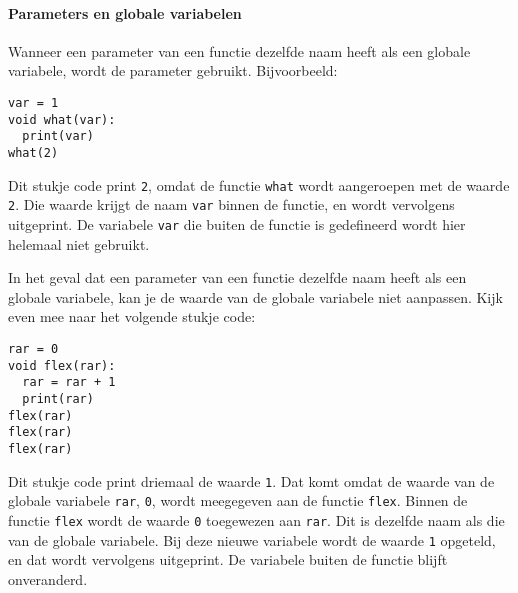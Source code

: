 
\paragraph{Parameters en globale variabelen}

Wanneer een parameter van een functie dezelfde naam heeft als een globale variabele, wordt de parameter gebruikt. Bijvoorbeeld:

\begin{verbatim}
var = 1
void what(var):
  print(var)
what(2)
\end{verbatim}

Dit stukje code print \texttt{2}, omdat de functie \texttt{what} wordt aangeroepen met de waarde \texttt{2}. Die waarde krijgt de naam \texttt{var} binnen de functie, en wordt vervolgens uitgeprint. De variabele \texttt{var} die buiten de functie is gedefineerd wordt hier helemaal niet gebruikt.

In het geval dat een parameter van een functie dezelfde naam heeft als een globale variabele, kan je de waarde van de globale variabele niet aanpassen. Kijk even mee naar het volgende stukje code:

\begin{verbatim}
rar = 0
void flex(rar):
  rar = rar + 1
  print(rar)
flex(rar)
flex(rar)
flex(rar)
\end{verbatim}

Dit stukje code print driemaal de waarde \texttt{1}. Dat komt omdat de waarde van de globale variabele \texttt{rar}, \texttt{0}, wordt meegegeven aan de functie \texttt{flex}. Binnen de functie \texttt{flex} wordt de waarde \texttt{0} toegewezen aan \texttt{rar}. Dit is dezelfde naam als die van de globale variabele. Bij deze nieuwe variabele wordt de waarde \texttt{1} opgeteld, en dat wordt vervolgens uitgeprint. De variabele buiten de functie blijft onveranderd.

